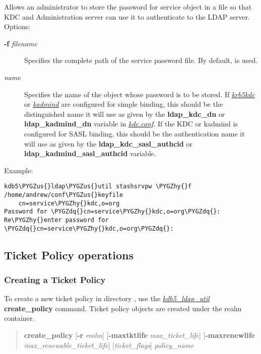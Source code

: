 \documentclass[letterpaper,10pt,english]{sphinxmanual}
\def\PYGZus{\char`\_}
\def\PYGZhy{\char`\-}
\def\PYGZdq{\char`\"}
\begin{document}
Allows an administrator to store the password for service object in a
file so that KDC and Administration server can use it to authenticate
to the LDAP server.  Options:
\begin{description}
\item[{\textbf{-f} \emph{filename}}] \leavevmode
Specifies the complete path of the service password file. By
default,  is used.

\item[{\emph{name}}] \leavevmode
Specifies the name of the object whose password is to be stored.
If {\hyperref[admin/admin_commands/krb5kdc:krb5kdc-8]{\emph{krb5kdc}}} or {\hyperref[admin/admin_commands/kadmind:kadmind-8]{\emph{kadmind}}} are configured for
simple binding, this should be the distinguished name it will
use as given by the \textbf{ldap\_kdc\_dn} or \textbf{ldap\_kadmind\_dn}
variable in {\hyperref[admin/conf_files/kdc_conf:kdc-conf-5]{\emph{kdc.conf}}}.  If the KDC or kadmind is
configured for SASL binding, this should be the authentication
name it will use as given by the \textbf{ldap\_kdc\_sasl\_authcid} or
\textbf{ldap\_kadmind\_sasl\_authcid} variable.

\end{description}

Example:

\begin{Verbatim}[commandchars=\\\{\}]
kdb5\PYGZus{}ldap\PYGZus{}util stashsrvpw \PYGZhy{}f /home/andrew/conf\PYGZus{}keyfile
    cn=service\PYGZhy{}kdc,o=org
Password for \PYGZdq{}cn=service\PYGZhy{}kdc,o=org\PYGZdq{}:
Re\PYGZhy{}enter password for \PYGZdq{}cn=service\PYGZhy{}kdc,o=org\PYGZdq{}:
\end{Verbatim}


\subsection{Ticket Policy operations}
\label{admin/database:ticket-policy-operations}

\subsubsection{Creating a Ticket Policy}
\label{admin/database:creating-a-ticket-policy}
To create a new ticket policy in directory , use the
{\hyperref[admin/admin_commands/kdb5_ldap_util:kdb5-ldap-util-8]{\emph{kdb5\_ldap\_util}}} \textbf{create\_policy} command.  Ticket policy
objects are created under the realm container.
\begin{quote}

\textbf{create\_policy}
{[}\textbf{-r} \emph{realm}{]}
{[}\textbf{-maxtktlife} \emph{max\_ticket\_life}{]}
{[}\textbf{-maxrenewlife} \emph{max\_renewable\_ticket\_life}{]}
{[}\emph{ticket\_flags}{]}
\emph{policy\_name}
\end{quote}
\end{document}
